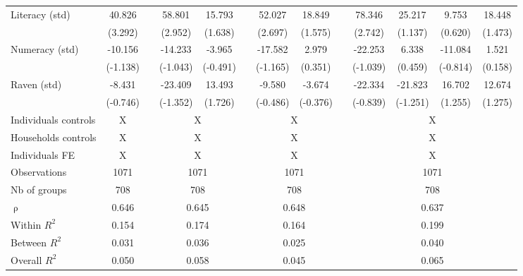 \begin{table}[htbp]
{\begin{tabular}{lcccccccccccc}
    Literacy (std) & \cellcolor[rgb]{ 1,  1,  0}40.826 &       & \cellcolor[rgb]{ 1,  1,  0}58.801 & 15.793 &       & \cellcolor[rgb]{ 1,  1,  0}52.027 & 18.849 &       & \cellcolor[rgb]{ 1,  1,  0}78.346 & 25.217 & 9.753 & 18.448 \\
          & (3.292) &       & (2.952) & (1.638) &       & (2.697) & (1.575) &       & (2.742) & (1.137) & (0.620) & (1.473) \\
    Numeracy (std) & -10.156 &       & -14.233 & -3.965 &       & -17.582 & 2.979 &       & -22.253 & 6.338 & -11.084 & 1.521 \\
          & (-1.138) &       & (-1.043) & (-0.491) &       & (-1.165) & (0.351) &       & (-1.039) & (0.459) & (-0.814) & (0.158) \\
    Raven (std) & -8.431 &       & -23.409 & \cellcolor[rgb]{ 1,  1,  0}13.493 &       & -9.580 & -3.674 &       & -22.334 & -21.823 & 16.702 & 12.674 \\
          & (-0.746) &       & (-1.352) & (1.726) &       & (-0.486) & (-0.376) &       & (-0.839) & (-1.251) & (1.255) & (1.275) \\
\cmidrule{1-2}\cmidrule{4-5}\cmidrule{7-8}\cmidrule{10-13}    Individuals controls & X     &       & \multicolumn{2}{c}{X} &       & \multicolumn{2}{c}{X} &       & \multicolumn{4}{c}{X} \\
    Households controls & X     &       & \multicolumn{2}{c}{X} &       & \multicolumn{2}{c}{X} &       & \multicolumn{4}{c}{X} \\
    Individuals FE & X     &       & \multicolumn{2}{c}{X} &       & \multicolumn{2}{c}{X} &       & \multicolumn{4}{c}{X} \\
    \midrule
    Observations & 1071  &       & \multicolumn{2}{c}{1071} &       & \multicolumn{2}{c}{1071} &       & \multicolumn{4}{c}{1071} \\
    Nb of groups & 708   &       & \multicolumn{2}{c}{708} &       & \multicolumn{2}{c}{708} &       & \multicolumn{4}{c}{708} \\
    $\uprho$ & 0.646 &       & \multicolumn{2}{c}{0.645} &       & \multicolumn{2}{c}{0.648} &       & \multicolumn{4}{c}{0.637} \\
    Within $R^2$ & 0.154 &       & \multicolumn{2}{c}{0.174} &       & \multicolumn{2}{c}{0.164} &       & \multicolumn{4}{c}{0.199} \\
    Between $R^2$ & 0.031 &       & \multicolumn{2}{c}{0.036} &       & \multicolumn{2}{c}{0.025} &       & \multicolumn{4}{c}{0.040} \\
    Overall $R^2$ & 0.050 &       & \multicolumn{2}{c}{0.058} &       & \multicolumn{2}{c}{0.045} &       & \multicolumn{4}{c}{0.065} \\

\end{tabular}}
\end{table}
